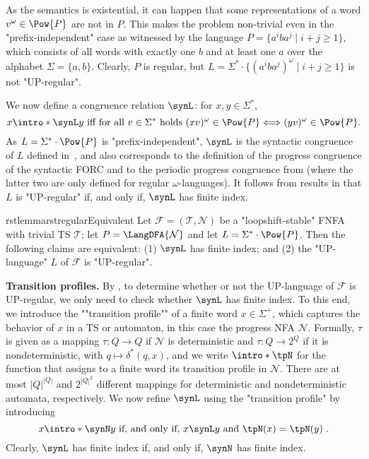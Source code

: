 \documentclass[a4paper,USenglish,cleveref,autoref,thm-restate]{lipics-v2021}
\newcommand{\mc}[1]{\ensuremath{\mathcal{#1}}}
\newcommand{\T}{\mc{T}}
\newcommand{\F}{\mc{F}}
\newcommand{\N}{\mc{N}}
\begin{document}
As the semantics is existential, it can happen that some representations of  a word $v^\omega \in \Pow{P}$ are not in $P$.
This makes the problem non-trivial even in the "prefix-independent" case as witnessed by the language $P = \{a^iba^j \mid i+j \ge 1\}$, which consists of all words with exactly one $b$ and at least one $a$ over the alphabet $\Sigma = \{a,b\}$.
Clearly, $P$ is regular, but $L = \Sigma^* \cdot \{\left(a^iba^j\right)^\omega \mid i+j \ge 1\}$ is not "UP-regular".

\AP
We now define a congruence relation $\synL$: for $x, y \in \Sigma^*$,
\[ x \intro*\synL y \text{ iff for all } v\in\Sigma^* \text{ holds } (xv)^{\omega} \in \Pow{P} \Longleftrightarrow (yv)^{\omega} \in \Pow{P}. \]
As $L = \Sigma^* \cdot \Pow{P}$ is "prefix-independent", $\synL$ is the syntactic congruence of $L$ defined in~\cite{Arnold85}, and also corresponds to the definition of the progress congruence of the syntactic FORC \cite{MalerS97} and to the periodic progress congruence from \cite{AngluinF16} (where the latter two are only defined for regular $\omega$-languages). It follows from results in \cite{CalbrixNP93,AngluinBF18} that $L$ is "UP-regular" if, and only if, $\synL$ has finite index.

\begin{restatable}{rstlemma}{rstregularEquivalent}
  \label{lem:regularEquivalent}
  Let $\F=(\T,\N)$ be a "loopshift-stable" FNFA with trivial TS $\T$; let $P=\LangDFA{\N}$ and let $L = \Sigma^* \cdot \Pow{P}$.
  Then the following claims are equivalent:
(1) $\synL$ has finite index; and (2) the "UP-language" $L$ of $\F$ is "UP-regular".
\end{restatable}

\noindent\textbf{Transition profiles.}
\AP
By , to determine whether or not the UP-language of $\F$ is UP-regular, we only need to check whether $\synL$ has finite index.
To this end, we introduce the ""transition profile"" of a finite word $x \in \Sigma^+$, which captures the behavior of $x$ in a TS or automaton, in this case the progress NFA $\N$.
Formally, $\tau$ is given as a mapping $\tau : Q \to Q$ if $\N$ is deterministic and $\tau : Q \to 2^Q$ if it is nondeterministic, with $q \mapsto \delta^*(q, x)$, and we write $\intro*\tpN$ for the function that assigns to a finite word its transition profile in $\N$.
There are at most $|Q|^{|Q|}$ and $2^{|Q|^2}$ different mappings for deterministic and nondeterministic automata, respectively.
\AP
We now refine $\synL$ using the "transition profile" by introducing
\[x \intro*\synN y \text{ if, and only if, }  x \synL y \text{ and } \tpN(x) = \tpN(y)\ .\]
Clearly, $\synL$ has finite index if, and only if, $\synN$ has finite index.
\end{document}
